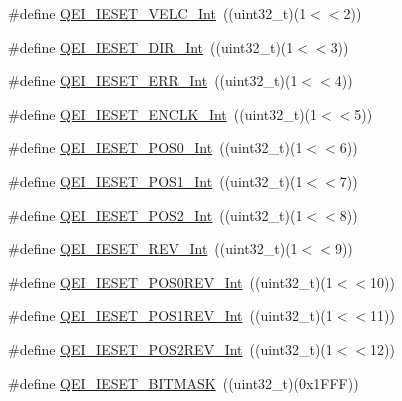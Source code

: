 \begin{DoxyCompactItemize}
\item 
\#define \hyperlink{group___q_e_i___private___macros_ga64b1388971445eb625234dd97e62fdb5}{\-Q\-E\-I\-\_\-\-I\-E\-S\-E\-T\-\_\-\-V\-E\-L\-C\-\_\-\-Int}~((uint32\-\_\-t)(1$<$$<$2))
\item 
\#define \hyperlink{group___q_e_i___private___macros_gacba10cdadb9de0d7663ceff001723155}{\-Q\-E\-I\-\_\-\-I\-E\-S\-E\-T\-\_\-\-D\-I\-R\-\_\-\-Int}~((uint32\-\_\-t)(1$<$$<$3))
\item 
\#define \hyperlink{group___q_e_i___private___macros_ga25306b572a3dff74e158a7ea144927b0}{\-Q\-E\-I\-\_\-\-I\-E\-S\-E\-T\-\_\-\-E\-R\-R\-\_\-\-Int}~((uint32\-\_\-t)(1$<$$<$4))
\item 
\#define \hyperlink{group___q_e_i___private___macros_ga090b28a6772645b95c8ce125ad28191f}{\-Q\-E\-I\-\_\-\-I\-E\-S\-E\-T\-\_\-\-E\-N\-C\-L\-K\-\_\-\-Int}~((uint32\-\_\-t)(1$<$$<$5))
\item 
\#define \hyperlink{group___q_e_i___private___macros_ga94538a8c1b0f8d9751360c78a2565cab}{\-Q\-E\-I\-\_\-\-I\-E\-S\-E\-T\-\_\-\-P\-O\-S0\-\_\-\-Int}~((uint32\-\_\-t)(1$<$$<$6))
\item 
\#define \hyperlink{group___q_e_i___private___macros_gaab604fdd70e70d587d83f7e0365311dc}{\-Q\-E\-I\-\_\-\-I\-E\-S\-E\-T\-\_\-\-P\-O\-S1\-\_\-\-Int}~((uint32\-\_\-t)(1$<$$<$7))
\item 
\#define \hyperlink{group___q_e_i___private___macros_gaeddd5f20aee97ad2ba44011257fd8a3c}{\-Q\-E\-I\-\_\-\-I\-E\-S\-E\-T\-\_\-\-P\-O\-S2\-\_\-\-Int}~((uint32\-\_\-t)(1$<$$<$8))
\item 
\#define \hyperlink{group___q_e_i___private___macros_gae35f1e90239c5f93eca5a98c0bcfd9d1}{\-Q\-E\-I\-\_\-\-I\-E\-S\-E\-T\-\_\-\-R\-E\-V\-\_\-\-Int}~((uint32\-\_\-t)(1$<$$<$9))
\item 
\#define \hyperlink{group___q_e_i___private___macros_ga06a002b9ecc627a51ee4c43483ade601}{\-Q\-E\-I\-\_\-\-I\-E\-S\-E\-T\-\_\-\-P\-O\-S0\-R\-E\-V\-\_\-\-Int}~((uint32\-\_\-t)(1$<$$<$10))
\item 
\#define \hyperlink{group___q_e_i___private___macros_gacef8f04aaef9481b006252c7865f4a63}{\-Q\-E\-I\-\_\-\-I\-E\-S\-E\-T\-\_\-\-P\-O\-S1\-R\-E\-V\-\_\-\-Int}~((uint32\-\_\-t)(1$<$$<$11))
\item 
\#define \hyperlink{group___q_e_i___private___macros_gaa0704486eb62ac5a76ce7c3af1c352d6}{\-Q\-E\-I\-\_\-\-I\-E\-S\-E\-T\-\_\-\-P\-O\-S2\-R\-E\-V\-\_\-\-Int}~((uint32\-\_\-t)(1$<$$<$12))
\item 
\#define \hyperlink{group___q_e_i___private___macros_ga0261603cead4d95d04318dde6c7ca321}{\-Q\-E\-I\-\_\-\-I\-E\-S\-E\-T\-\_\-\-B\-I\-T\-M\-A\-S\-K}~((uint32\-\_\-t)(0x1\-F\-F\-F))
$$
\end{DoxyCompactItemize}
